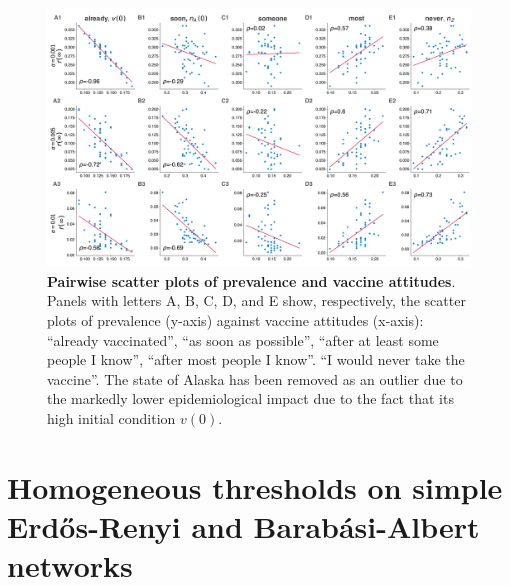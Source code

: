 \documentclass[
 reprint,
 amsmath,amssymb,
 aps,
]{revtex4-2}
\begin{document}
\begin{figure}
\centering
\includegraphics[width=\textwidth]{figure8.pdf}
\caption[Pairwise scatter plots of prevalence and vaccine attitudes]{\label{fig:supp_multilayer_scatters}\textbf{Pairwise scatter plots of prevalence and vaccine attitudes}. Panels with letters A, B, C, D, and E show, respectively, the scatter plots of prevalence (y-axis) against vaccine attitudes (x-axis): ``already vaccinated'', ``as soon as possible'', ``after at least some people I know'', ``after most people I know''. ``I would never take the vaccine''. The state of Alaska has been removed as an outlier due to the markedly lower epidemiological impact due to the fact that its high initial condition $v(0)$.}
\end{figure}

\clearpage

\section{Homogeneous thresholds on simple Erd\H{o}s-Renyi and Barabási-Albert networks}
\label{app:homogeneous_erba}

\setcounter{figure}{0}
\end{document}
